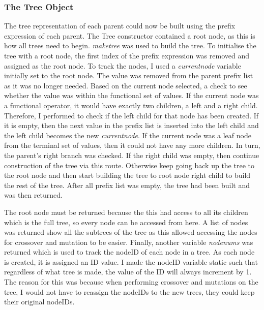 \documentclass[11pt]{article}
\begin{document}
\subsubsection{The Tree Object}\label{subsubsec:tree}
The tree representation of each parent could now be built using the prefix expression of each parent. The Tree constructor contained a root node, as this is how all trees need to begin. \textit{make\textunderscore tree} was used to build the tree. To initialise the tree with a root node, the first index of the prefix expression was removed and assigned as the root node. To track the nodes, I used a \textit{current\textunderscore node} variable initially set to the root node.
The value was removed from the parent prefix list as it was no longer needed. Based on the current node selected, a check to see whether the value was within the functional set of values. If the current node was a functional operator,  it would have exactly two children, a left and a right child. Therefore, I performed to check if the left child for that node has been created. If it is empty, then the next value in the prefix list is inserted into the left child and the left child becomes the new \textit{current\textunderscore node}. If the current node was a leaf node from the terminal set of values, then it could not have any more children. In turn, the parent's right branch was checked. If the right child was empty, then continue construction of the tree via this route. Otherwise keep going back up the tree to the root node and then start building the tree to root node right child to build the rest of the tree. After all prefix list was empty, the tree had been built and was then returned. 

The root node must be returned because the this had access to all its children which is the full tree, so every node can be accessed from here. A list of nodes was returned show all the subtrees of the tree as this allowed accessing the nodes for crossover and mutation to be easier. Finally, another variable \textit{nodenums} was returned which is used to track the nodeID of each node in a tree. As each node is created, it is assigned an ID value. I made the nodeID variable static such that regardless of what tree is made, the value of the ID will always increment by 1. The reason for this was because when performing crossover and mutations on the tree, I would not have to reassign the nodeIDs to the new trees, they could keep their original nodeIDs.
\end{document}
